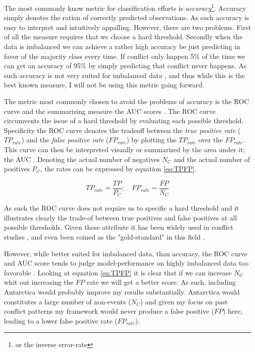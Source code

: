 \documentclass[a4paper]{article}
\begin{document}
The most commonly know metric for classification efforts is \emph{accuracy}\footnote{or the inverse error-rate}. Accuracy simply denotes the ration of correctly predicted observations. As such accuracy is easy to interpret and intuitively appalling. However, there are two problems. First of all the measure requires that we choose a hard threshold. Secondly when the data is imbalanced we can achieve a rather high accuracy be just predicting in favor of the majority class every time. If conflict only happen 5\% of the time we can get an accuracy of 95\% by simply predicting that conflict never happens. As such accuracy is not very suited for imbalanced data \citep[1264]{He_2008}, and thus while this is the best known measure, I will not be using this metric going forward.\par


The metric most commonly chosen to avoid the problems of accuracy is the ROC curve and the summarizing measure the AUC scores \citep[1277-1278]{He_2008}. The ROC curve circumvents the issue of a hard threshold by evaluating each possible threshold. Specificity the ROC curve denotes the tradeoff between the \emph{true positive rate} ($TP_{rate}$) and the \emph{false positive rate} ($FP_{rate}$) by plotting the $TP_{rate}$ over the $FP_{rate}$. This curve can then be interpreted visually or summarized by the area under it; the AUC \citep[1277-1278]{He_2008}. Denoting the actual number of negatives $N_C$ and the actual number of positives $P_C$, the rates can be expressed by equation \ref{eq:TPFP}.\par

\[
TP_{rate} = \frac{TP}{P_C};\quad FP_{rate}=\frac{FP}{N_C} \tag{15} \label{eq:TPFP}
\]

As such the ROC curve does not require us to specific a hard threshold and it illustrates clearly the trade-of between true positives and false positives at all possible thresholds. Given these attribute it has been widely used in conflict studies \citep[14]{chadefaux2017conflict}, and even been coined as the "gold-standard" in this field \citep[366]{perry_2013}. 

However, while better suited for imbalanced data, than accuracy, the ROC curve and AUC score tends to judge model-performance on highly imbalanced data too favorable \citep[1278]{He_2008}. Looking at equation \ref{eq:TPFP} it is clear that if we can increase $N_C$ whit out increasing the $FP$ rate we will get a better score. As such, including Antarctica would probably improve my results substantially. Antarctica would constitutes a large number of non-events ($N_C$) and given my focus on past conflict patterns my framework would never produce a false positive ($FP$) here, leading to a lower false positive rate ($FP_{rate}$).\par
\end{document}
